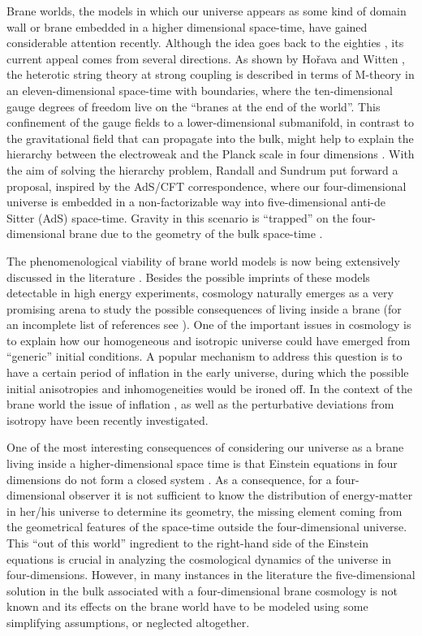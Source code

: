 \documentclass[prd,a4paper,twocolumn,superscriptaddress,nofootinbib,showpacs]{revtex4}
\begin{document}
Brane worlds, the models in which our universe appears as some kind of domain wall or brane
embedded in a higher dimensional space-time, have gained considerable attention recently.
Although the idea goes back to the eighties \cite{rubshap}, its current appeal comes from 
several directions. As shown by Ho\v{r}ava and Witten \cite{hw}, 
the \coordHE{} heterotic string theory at strong coupling is described in terms 
of M-theory in an eleven-dimensional space-time with boundaries, where the ten-dimensional 
gauge degrees of freedom live on the ``branes at the end of the world''. This confinement
of the gauge fields to a lower-dimensional submanifold, in contrast to the gravitational field
that can propagate into the bulk, might help to explain the hierarchy between the 
electroweak and the Planck scale in four dimensions \cite{lardim}. With the aim of
solving the hierarchy problem, Randall and Sundrum \cite{rs}
put forward a proposal, inspired by
the AdS/CFT correspondence, where our four-dimensional universe is embedded in a non-factorizable
way into five-dimensional anti-de Sitter (AdS) space-time. Gravity in this scenario is ``trapped'' 
on the four-dimensional brane due to the geometry of the bulk space-time \cite{rs,gt}.

The phenomenological viability of brane world models  is now being extensively discussed in the 
literature \cite{phen}. Besides the possible imprints of these models detectable in high energy 
experiments, cosmology naturally emerges as a very promising arena to study  the possible consequences
of living inside a brane (for an incomplete list of references see \cite{bc,mwbh,cll}). 
One of the important issues in  cosmology is 
to explain how our homogeneous and isotropic universe could have
emerged from ``generic'' initial conditions. A popular mechanism to address this question is
to have a certain period of inflation in the early universe, during
which the possible initial anisotropies and inhomogeneities would be ironed off.
In the context of the brane world the issue of inflation 
\cite{mwbh,cll,hl}, as well as the perturbative
deviations from isotropy \cite{mss,svf} have been recently investigated. 

One of the most interesting consequences of 
considering our universe as a brane living inside a higher-dimensional space time is that
Einstein equations in four dimensions do not form a closed system \cite{mss}. As a
consequence, for a four-dimensional observer it is not sufficient to know the distribution of 
energy-matter in her/his universe to determine its geometry,  the missing element
coming from the geometrical features of the space-time outside the four-dimensional
universe. This ``out of this world'' ingredient to the right-hand side of the Einstein equations
is crucial in analyzing the cosmological dynamics of the universe in four-dimensions. However, 
in many instances in the literature the five-dimensional solution in the bulk associated with a
four-dimensional brane cosmology is not known and its effects on the brane world have 
to be modeled 
using some simplifying  assumptions, or neglected altogether.  
\end{document}
